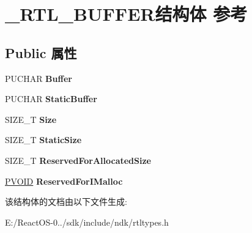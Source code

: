\hypertarget{struct___r_t_l___b_u_f_f_e_r}{}\section{\+\_\+\+R\+T\+L\+\_\+\+B\+U\+F\+F\+E\+R结构体 参考}
\label{struct___r_t_l___b_u_f_f_e_r}
\subsection*{Public 属性}
\begin{DoxyCompactItemize}
\item 
\mbox{\label{struct___r_t_l___b_u_f_f_e_r_a5b24fa65673f70e3b2d8b541003de955}} 
P\+U\+C\+H\+AR {\bfseries Buffer}
\item 
\mbox{\label{struct___r_t_l___b_u_f_f_e_r_a1215b2d1b3915ce99db81cb1338366d3}} 
P\+U\+C\+H\+AR {\bfseries Static\+Buffer}
\item 
\mbox{\label{struct___r_t_l___b_u_f_f_e_r_ac63eec35c348e109ff36398e02545ba4}} 
S\+I\+Z\+E\+\_\+T {\bfseries Size}
\item 
\mbox{\label{struct___r_t_l___b_u_f_f_e_r_a0c929c8107ff401d0e70571429313c7c}} 
S\+I\+Z\+E\+\_\+T {\bfseries Static\+Size}
\item 
\mbox{\label{struct___r_t_l___b_u_f_f_e_r_a5ae199baa399c2f2ed595c5ae485f2a4}} 
S\+I\+Z\+E\+\_\+T {\bfseries Reserved\+For\+Allocated\+Size}
\item 
\mbox{\label{struct___r_t_l___b_u_f_f_e_r_a1438e0a9371a7f9f9edc97995b855eee}} 
\hyperlink{interfacevoid}{P\+V\+O\+ID} {\bfseries Reserved\+For\+I\+Malloc}
\end{DoxyCompactItemize}


该结构体的文档由以下文件生成\+:\begin{DoxyCompactItemize}
\item 
E\+:/\+React\+O\+S-\/0../sdk/include/ndk/rtltypes.\+h\end{DoxyCompactItemize}

